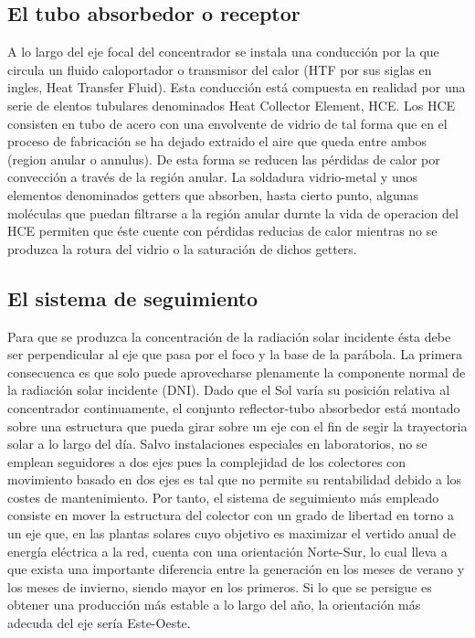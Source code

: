 \subsection{El tubo absorbedor o receptor}
\label{tuboabsorbedor}
A lo largo del eje focal del concentrador se instala una conducción por la que circula un fluido caloportador o transmisor del calor (HTF por sus siglas en ingles, Heat Transfer Fluid). Esta conducción está compuesta en realidad por una serie de elentos tubulares denominados Heat Collector Element, HCE. Los HCE consisten en tubo de acero con una envolvente de vidrio de tal forma que en el proceso de fabricación se ha dejado extraido el aire que queda entre ambos (region anular o annulus). De esta forma se reducen las pérdidas de calor por convección a través de la región anular. La soldadura vidrio-metal y unos elementos denominados getters que absorben, hasta cierto punto, algunas moléculas que puedan filtrarse a la región anular durnte la vida de operacion del HCE permiten que éste cuente con pérdidas reducias de calor mientras no se produzca la rotura del vidrio o la saturación de dichos getters. 

\subsection{El sistema de seguimiento}
\label{sistemadeseguimiento}
Para que se produzca la concentración de la radiación solar incidente ésta debe ser perpendicular al eje que pasa por el foco y la base de la parábola. La primera consecuenca es que solo puede aprovecharse plenamente la componente normal de la radiación solar incidente (DNI). Dado que el Sol varía su posición relativa al concentrador continuamente, el conjunto reflector-tubo absorbedor está montado sobre una estructura que pueda girar sobre un eje con el fin de segir la trayectoria solar a lo largo del día. Salvo instalaciones especiales en laboratorios, no se emplean seguidores a dos ejes pues la complejidad de los colectores con movimiento basado en dos ejes es tal que no permite su rentabilidad debido a los costes de mantenimiento. Por tanto, el sistema de seguimiento más empleado consiste en mover la estructura del colector con un grado de libertad en torno a un eje que, en las plantas solares cuyo objetivo es maximizar el vertido anual de energía eléctrica a la red, cuenta con una orientación Norte-Sur, lo cual lleva a que exista una importante diferencia entre la generación en los meses de verano y los meses de invierno, siendo mayor en los primeros. Si lo que se persigue es obtener una producción más estable a lo largo del año, la orientación más adecuda del eje sería Este-Oeste.

